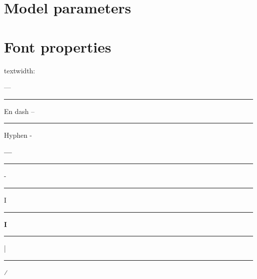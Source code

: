 \documentclass[12pt,oneside,letterpaper]{report}
\begin{document}

\newpage

 



\appendix
% 



\chapter{Model parameters}\label{sec:jack}


\chapter{Font properties}

textwidth: \the\textwidth

\newlength{\myw}
\newlength{\myl}

---\rule[2.4pt]{12pt}{0.6pt}
\settowidth{\myw}{---}\the\myw

En dash
\settowidth{\myw}{--}\the\myw
--\rule[2.4pt]{6pt}{0.6pt}

Hyphen
\settowidth{\myw}{-}\the\myw -


{\bf ---}\rule[2.2pt]{12pt}{1.1pt}

\settoheight{\myl}{---}\the\myl

-\rule[2.4pt]{3pt}{0.75pt}
I\rule{1.2pt}{8pt}
{\bf I}\rule{2.0pt}{8pt}
|\rule[-2pt]{0.6pt}{12pt}
\the\textheight


⁄
\end{document}
